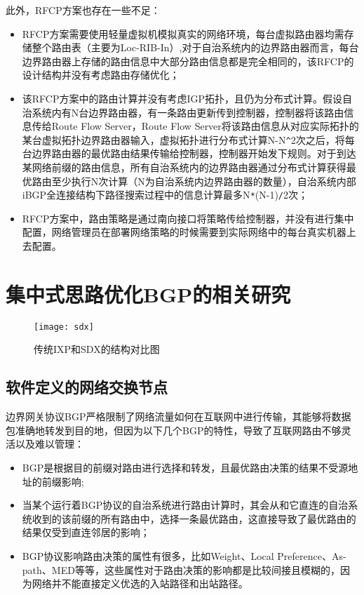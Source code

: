 此外，RFCP方案也存在一些不足：
\begin{itemize}
\item RFCP方案需要使用轻量虚拟机模拟真实的网络环境，每台虚拟路由器均需存储整个路由表（主要为Loc-RIB-In）,对于自治系统内的边界路由器而言，每台边界路由器上存储的路由信息中大部分路由信息都是完全相同的，该RFCP的设计结构并没有考虑路由存储优化；
\item 该RFCP方案中的路由计算并没有考虑IGP拓扑，且仍为分布式计算。假设自治系统内有N台边界路由器，有一条路由更新传到控制器，控制器将该路由信息传给Route Flow Server，Route Flow Server将该路由信息从对应实际拓扑的某台虚拟拓扑边界路由器输入，虚拟拓扑进行分布式计算N-N\verb+^+2次之后，将每台边界路由器的最优路由结果传输给控制器，控制器开始发下规则。对于到达某网络前缀的路由信息，所有自治系统内的边界路由器通过分布式计算获得最优路由至少执行N次计算（N为自治系统内边界路由器的数量），自治系统内部iBGP全连接结构下路径搜索过程中的信息计算最多N\verb+*+(N-1)\verb+/+2次；
\item RFCP方案中，路由策略是通过南向接口将策略传给控制器，并没有进行集中配置，网络管理员在部署网络策略的时候需要到实际网络中的每台真实机器上去配置。
\end{itemize}

\section{集中式思路优化BGP的相关研究}

\begin{figure}
  \centering
  \texttt{[image: sdx]}
  \caption{传统IXP和SDX的结构对比图}
  \label{fig:sdx}
\end{figure}

\subsection{软件定义的网络交换节点}
边界网关协议BGP严格限制了网络流量如何在互联网中进行传输，其能够将数据包准确地转发到目的地，但因为以下几个BGP的特性，导致了互联网路由不够灵活以及难以管理\cite{sdx2015sigcomm}：
\begin{itemize}
  \item BGP是根据目的前缀对路由进行选择和转发，且最优路由决策的结果不受源地址的前缀影响;
  \item 当某个运行着BGP协议的自治系统进行路由计算时，其会从和它直连的自治系统收到的该前缀的所有路由中，选择一条最优路由，这直接导致了最优路由的结果仅受到直连邻居的影响；
  \item BGP协议影响路由决策的属性有很多，比如Weight、Local Preference、As-path、MED等等，这些属性对于路由决策的影响都是比较间接且模糊的，因为网络并不能直接定义优选的入站路径和出站路径。
\end{itemize}

